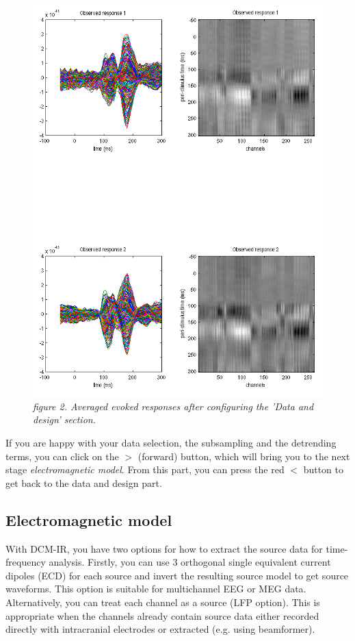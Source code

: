 \begin{figure}
\begin{center}
\includegraphics[width=160mm]{dcm_ir/figures/figure2}
\caption{\em  figure 2.  Averaged evoked responses after configuring the 'Data and design' section.\label{dcm-ir:fig:2}}
\end{center}
\end{figure}

If you are happy with your data selection, the subsampling and the detrending terms, you can click on the $>$ (forward) button, which will bring you to the next stage \textit{electromagnetic model}. From this part, you can press the red $<$ button to get back to the data and design part.

\subsection{Electromagnetic model}
With DCM-IR, you have two options for how to extract the source data for time-frequency analysis. Firstly, you can use 3 orthogonal single equivalent current dipoles (ECD) for each source and invert the resulting source model to get source waveforms. This option is suitable for multichannel EEG or MEG data. Alternatively, you can treat each channel as a source (LFP option). This is appropriate when the channels already contain source data either recorded directly with intracranial electrodes or extracted (e.g. using beamformer). 

